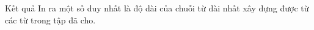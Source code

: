 Kết quả
In ra một số duy nhất là độ dài của chuỗi từ dài nhất xây dựng được từ các từ trong tập đã cho.